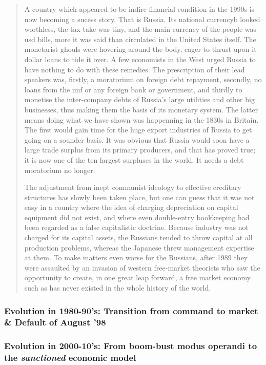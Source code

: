 \begin{quote}
A country which appeared to be indire financial condition in the 1990s is now becoming a sucess story. That is Russia. Its national currencyb looked worthless, the tax take was tiny, and the main currency of the people was \acl{usd} bills, more it was said than circulated in the United States itself. The monetarist ghouls were hovering around the body, eager to thrust upon it dollar loans to tide it over. A few economists in the West urged Russia to have nothing to do with these remedies. The prescription of their lead speakers was, firstly, a moratorium on foreign debt repayment, secondly, no loans from the \acl{imf} or any foreign bank or government, and thirdly to monetise the inter-company debts of Russia's large utilities and other big businesses, thus making them the basis of its monetary system. The latter means doing what we have shown was happenning in the 1830s in Britain. The first would gain time for the huge export industries of Russia to get going on a sounder basis. It was obvious that Russia would soon have a large trade surplus from its primary producers, and that has proved true; it is now one of the ten largest surpluses in the world. It needs a debt moratorium no longer. \par
The adjustment from inept communist ideology to effective creditary structures has slowly been taken place, but one can guess that it was not easy in a country where the idea of charging depreciation on capital equipment did not exist, and where even double-entry bookkeeping had been regarded as a false capitalistic doctrine. Because industry was not charged for its capital assets, the Russians tended to throw capital at all production problems, whereas the Japanese threw management expertise at them. To make matters even worse for the Russians, after 1989 they were assaulted by an invasion of western free-market theorists who saw the opportunity to create, in one great leap forward, a free market economy such as has never existed in the whole history of the world. \citeyearpar[pp.233-234]{gardiner2006}
\end{quote}

\subsubsection*{Evolution in 1980-90's: Transition from command to market \newline \& Default of August '98}
    
\subsubsection*{Evolution in 2000-10's: From boom-bust modus operandi to \newline the \textit{sanctioned} economic model}

